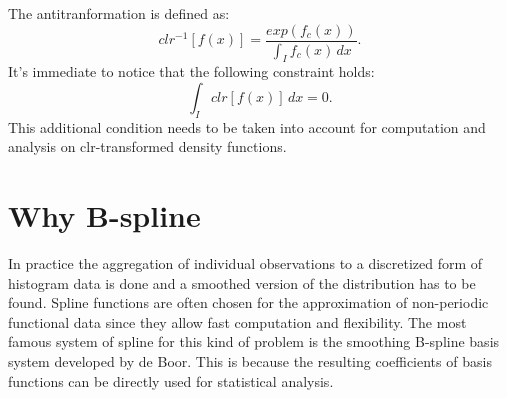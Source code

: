 The antitranformation is defined as: 
\[  clr^{-1}[f(x)]= \frac{exp(f_c(x))}{\int_{I} f_c(x)\, dx}. 	\]
It's immediate to notice that the following constraint holds:
\[	\int_{I} clr[f(x)]\, dx = 0. 			\]
This additional condition needs to be taken into account for computation and analysis on clr-transformed density functions.


\section{Why B-spline}
In practice the aggregation of individual observations to a discretized form of histogram data is done and a smoothed version of the distribution has to be found.
Spline functions are often chosen for the approximation of non-periodic functional data since they allow fast computation and flexibility. The most famous system of spline for this kind of problem is the smoothing B-spline basis system developed by de Boor. This is because the resulting coefficients of basis functions can be directly used for statistical analysis. %

